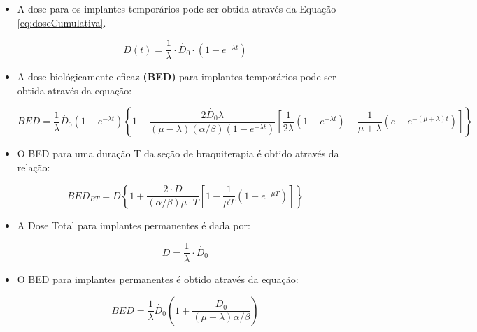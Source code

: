 \documentclass[11pt,a4paper]{article}
\begin{document}
			\begin{itemize}
		
			
				\item A dose para os implantes temporários pode ser obtida através da Equação \ref{eq:doseCumulativa}. 

					$$D(t) = \frac{1}{\lambda} \cdot \dot{D_0} \cdot \left(1 - e^{-\lambda t}\right)$$

				\item A dose biológicamente eficaz \textbf{\textcolor{CarnationPink}{(BED)}} para implantes temporários pode ser obtida através da equação:

					\begin{equation}
						BED = \frac{1}{\lambda} \dot{D_0}\left(1 - e^{-\lambda t}\right)
						\left\{ 1 + \frac{2 \dot{D_0}\lambda}{(\mu - \lambda)(\alpha / \beta) (1 - e^{-\lambda t})}
						\left[\frac{1}{2\lambda}(1 - e^{-\lambda t }) - \frac{1}{\mu + \lambda} (e - e^{-(\mu + \lambda) t})\right]\right\} 
					\end{equation}

				\item O BED para uma duração T da seção de braquiterapia é obtido através da relação:

					\begin{equation}
						BED_{BT} = D \left\{ 1 + \frac{2 \cdot D}{(\alpha / \beta)\mu \cdot T}
						\left[1 - \frac{1}{\mu T} (1 - e^{-\mu T})\right]\right\}
					\end{equation}
				
				\item A Dose Total para implantes permanentes é dada por:
					
					\begin{equation}
						D = \frac{1}{\lambda} \cdot \dot{D_0}
					\end{equation}
				
				\item O BED para implantes permanentes é obtido através da equação:
					
					\begin{equation}
						BED = \frac{1}{\lambda} \dot{D_0} \left(1 + \frac{\dot{D_0}}{(\mu + \lambda) \alpha / \beta}\right)
					\end{equation}
			
			\end{itemize}













	
\end{document}
